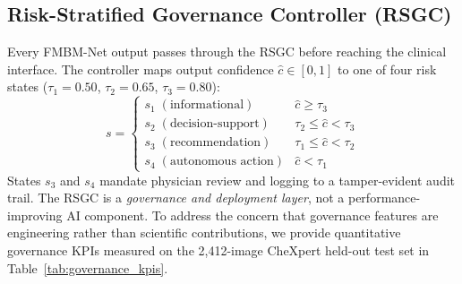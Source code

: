 \documentclass{ieeeaccess}
\begin{document}
\subsection{Risk-Stratified Governance Controller (RSGC)}

Every FMBM-Net output passes through the RSGC before reaching the clinical
interface. The controller maps output confidence $\hat{c}\!\in\![0,1]$ to
one of four risk states ($\tau_1\!=\!0.50$, $\tau_2\!=\!0.65$,
$\tau_3\!=\!0.80$):
\begin{equation}
s = \begin{cases}
s_1\;(\text{informational})     & \hat{c}\geq\tau_3\\
s_2\;(\text{decision-support})  & \tau_2\leq\hat{c}<\tau_3\\
s_3\;(\text{recommendation})    & \tau_1\leq\hat{c}<\tau_2\\
s_4\;(\text{autonomous action}) & \hat{c}<\tau_1
\end{cases}
\label{eq:rsgc}
\end{equation}
States $s_3$ and $s_4$ mandate physician review and logging to a
tamper-evident audit trail. The RSGC is a \emph{governance and deployment
layer}, not a performance-improving AI component. To address the concern
that governance features are engineering rather than scientific contributions,
we provide quantitative governance KPIs measured on the 2,412-image CheXpert
held-out test set in Table~\ref{tab:governance_kpis}.
\end{document}
